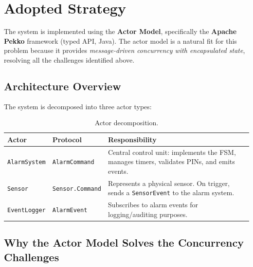 \documentclass[a4paper, 12pt]{article}
\begin{document}
\section{Adopted Strategy}

The system is implemented using the \textbf{Actor Model}, specifically the \textbf{Apache Pekko} framework (typed API, Java). The actor model is a natural fit for this problem because it provides \emph{message-driven concurrency with encapsulated state}, resolving all the challenges identified above.

\subsection{Architecture Overview}

The system is decomposed into three actor types:

\begin{table}[ht]
  \centering
  \begin{tabular}{@{} l l p{7.5cm} @{}}
    \toprule
    \textbf{Actor} & \textbf{Protocol} & \textbf{Responsibility} \\
    \midrule
    \texttt{AlarmSystem}  & \texttt{AlarmCommand} & Central control unit: implements the FSM, manages timers, validates PINs, and emits events. \\
    \texttt{Sensor}       & \texttt{Sensor.Command} & Represents a physical sensor. On trigger, sends a \texttt{SensorEvent} to the alarm system. \\
    \texttt{EventLogger}  & \texttt{AlarmEvent} & Subscribes to alarm events for logging/auditing purposes. \\
    \bottomrule
  \end{tabular}
  \caption{Actor decomposition.}
  \label{tab:actors}
\end{table}

\subsection{Why the Actor Model Solves the Concurrency Challenges}
\end{document}
